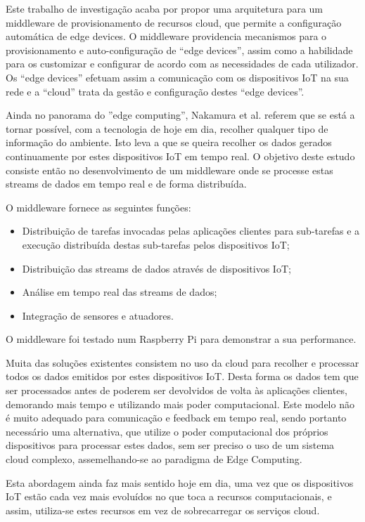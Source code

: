 Este trabalho de investigação acaba por propor uma arquitetura para um middleware de provisionamento de recursos cloud, que permite a configuração automática de edge devices. O middleware providencia mecanismos para o provisionamento e auto-configuração de “edge devices”, assim como a habilidade para os customizar e configurar de acordo com as necessidades de cada utilizador. Os “edge devices” efetuam assim a comunicação com os dispositivos IoT na sua rede e a “cloud” trata da gestão e configuração destes “edge devices”.


Ainda no panorama do ''edge computing'', Nakamura et al. \cite{iot-real-time} referem que se está a tornar possível, com a tecnologia de hoje em dia, recolher qualquer tipo de informação do ambiente. Isto leva a que se queira recolher os dados gerados continuamente por estes dispositivos IoT em tempo real. O objetivo deste estudo consiste então no desenvolvimento de um middleware onde se processe estas streams de dados em tempo real e de forma distribuída. 

O middleware fornece as seguintes funções:
\begin{itemize}
\item Distribuição de tarefas invocadas pelas aplicações clientes para sub-tarefas e a execução distribuída destas sub-tarefas pelos dispositivos IoT;
\item Distribuição das streams de dados através de dispositivos IoT;
\item Análise em tempo real das streams de dados;
\item Integração de sensores e atuadores.
\end{itemize}

O middleware foi testado num Raspberry Pi para demonstrar a sua performance.

Muita das soluções existentes consistem no uso da cloud para recolher e processar todos os dados emitidos por estes dispositivos IoT. Desta forma os dados tem que ser processados antes de poderem ser devolvidos de volta às aplicações clientes, demorando mais tempo e utilizando mais poder computacional. Este modelo não é muito adequado para comunicação e feedback em tempo real, sendo portanto necessário uma alternativa, que utilize o poder computacional dos próprios dispositivos para processar estes dados, sem ser preciso o uso de um sistema cloud complexo, assemelhando-se ao paradigma de Edge Computing. 

Esta abordagem ainda faz mais sentido hoje em dia, uma vez que os dispositivos IoT estão cada vez mais evoluídos no que toca a recursos computacionais, e assim, utiliza-se estes recursos em vez de sobrecarregar os serviços cloud. 

